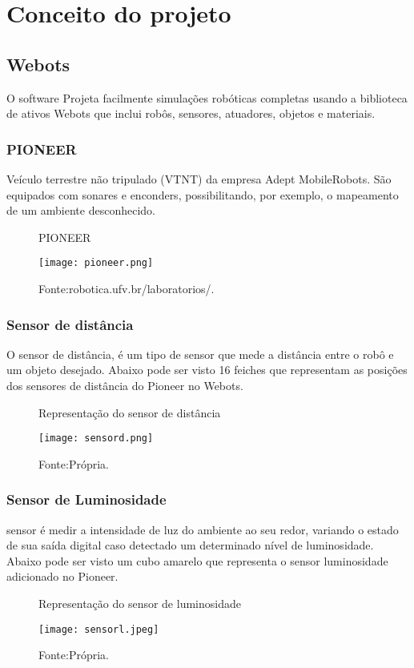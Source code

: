 \chapter{Conceito do projeto}
\label{chap:fundteor}
\section{Webots}
O software Projeta facilmente simulações robóticas completas usando a biblioteca de ativos Webots que inclui
robôs, sensores, atuadores, objetos e materiais.
\subsection{PIONEER}
Veículo terrestre não tripulado (VTNT) da empresa Adept MobileRobots.
São equipados com sonares e enconders, possibilitando, por exemplo, o mapeamento de um ambiente desconhecido.
\begin{figure} [h!]	
   \centering
   \caption{PIONEER}
   \texttt{[image: pioneer.png]}
   \caption*{Fonte:robotica.ufv.br/laboratorios/.}
   \label{fig:pioneer}
\end{figure}	


\subsection{Sensor de distância} 
O sensor de distância, é um tipo de sensor que mede a distância entre o robô e um objeto desejado.
Abaixo pode ser visto 16 feiches que representam as posições dos sensores de distância do Pioneer no Webots.

\begin{figure} [h!]	
   \centering
   \caption{Representação do sensor de distância}
   \texttt{[image: sensord.png]}
   \caption*{Fonte:Própria.}
   \label{fig:sensordistancia}

\end{figure}	

\subsection{Sensor de Luminosidade} 
sensor é medir a intensidade de luz do ambiente ao seu redor, variando o estado de sua saída digital caso detectado um determinado nível de luminosidade. 
Abaixo pode ser visto um cubo amarelo que representa o sensor luminosidade adicionado no Pioneer.

\begin{figure} [h!]	
   \centering
   \caption{Representação do sensor de luminosidade}
   \texttt{[image: sensorl.jpeg]}
   \caption*{Fonte:Própria.}
   \label{fig:sensorluminosidade}

\end{figure}	
